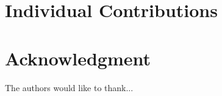 \documentclass[conference]{IEEEtran}
\begin{document}
\section{Individual Contributions}






\section*{Acknowledgment}


The authors would like to thank...

%
%



%
%
\end{document}
